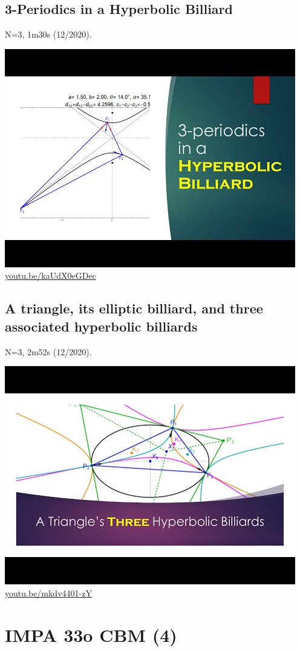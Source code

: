 \documentclass[12pt]{amsart}
\begin{document}
\subsection{3-Periodics in a Hyperbolic Billiard}
\label{vid:kaUdX0eGDec}
\noindent N=3, 1m30s (12/2020). 
\begin{center}\includegraphics[width=.5\textwidth]{pics/kaUdX0eGDec.jpg} \\ 
\href{https://youtu.be/kaUdX0eGDec}{\url{youtu.be/kaUdX0eGDec}}\end{center}
% 
\subsection{A triangle, its elliptic billiard, and three associated hyperbolic billiards}
\label{vid:mkdv4401-zY}
\noindent N=3, 2m52s (12/2020). 
\begin{center}\includegraphics[width=.5\textwidth]{pics/mkdv4401-zY.jpg} \\ 
\href{https://youtu.be/mkdv4401-zY}{\url{youtu.be/mkdv4401-zY}}\end{center}
% 

\section{IMPA 33o CBM (4)}
\end{document}
